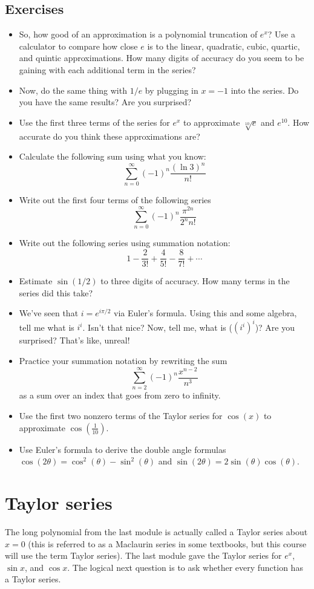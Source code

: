 \documentclass[twoside,openright,titlepage,a4paper]{book}
\begin{document}
\begin{sloppypar}
\subsection{Exercises}
\begin{itemize}
	\item So, how good of an approximation is a polynomial truncation of ${e^x}$? Use a calculator to compare how close $e$ is to the linear, quadratic, cubic, quartic, and quintic approximations. How many digits of accuracy do you seem to be gaining with each additional term in the series?
	\item Now, do the same thing with ${1/e}$ by plugging in ${x=-1}$ into the series. Do you have the same results? Are you surprised?
	\item Use the first three terms of the series for ${e^x}$ to approximate ${\sqrt[10]{e}}$ and ${e^{10}}$. How accurate do you think these approximations are?
	\item Calculate the following sum using what you know: \[\sum_{n=0}^\infty (-1)^n\frac{(\ln 3)^n}{n!}\]
	\item Write out the first four terms of the following series \[\sum_{n=0}^\infty (-1)^n\frac{\pi^{2n}}{2^n n!}\]
	\item Write out the following series using summation notation:\[1-\frac{2}{3!}+\frac{4}{5!}-\frac{8}{7!}+\cdots\]
	\item Estimate ${\sin(1/2)}$ to three digits of accuracy. How many terms in the series did this take?
	\item We've seen that ${i=e^{i\pi/2}}$ via Euler's formula. Using this and some algebra, tell me what is ${i^i}$. Isn't that nice? Now, tell me, what is ($(i^i)^i$)? Are you surprised? That's like, unreal!
	\item Practice your summation notation by rewriting the sum \[\sum_{n=2}^\infty (-1)^n\frac{x^{n-2}}{n^3}\] as a sum over an index that goes from zero to infinity.
	\item Use the first two nonzero terms of the Taylor series for ${\cos(x)}$ to approximate ${\cos(\frac{1}{10})}$.
	\item Use Euler's formula to derive the double angle formulas ${\cos(2\theta)=\cos^2(\theta)-\sin^2(\theta)}$ and ${\sin(2\theta)=2\sin(\theta)\cos(\theta)}$.
\end{itemize}

\section{Taylor series} \label{ChFunctionsSecTaylorSeries}
The long polynomial from the last module is actually called a Taylor series about ${x=0}$ (this is referred to as a Maclaurin series in some textbooks, but this course will use the term Taylor series). The last module gave the Taylor series for ${e^x}$, ${\sin x}$, and ${\cos x}$. The logical next question is to ask whether every function has a Taylor series.


\end{sloppypar}
\end{document}
